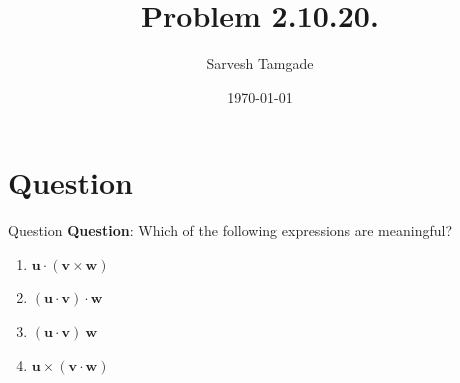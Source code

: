 \documentclass{beamer}
\title{Problem 2.10.20.}
\author{Sarvesh Tamgade}
\date{\today}
\theoremstyle{remark}
\numberwithin{equation}{section}
\begin{document}
\begin{frame}
\titlepage
\end{frame}
\section{Question}
\begin{frame}{Question}
\textbf{Question}:
 Which of the following expressions are meaningful?
\begin{multicols}{2}
\begin{enumerate}[label=(\alph*)]
     
\item $\mathbf{u} \cdot (\mathbf{v} \times \mathbf{w})$
\item $(\mathbf{u} \cdot \mathbf{v}) \cdot \mathbf{w}$
\item $(\mathbf{u} \cdot \mathbf{v})\ \mathbf{w}$
\item $\mathbf{u} \times (\mathbf{v} \cdot \mathbf{w})$

\end{enumerate}
\end{multicols}
\end{frame}
\end{document}
